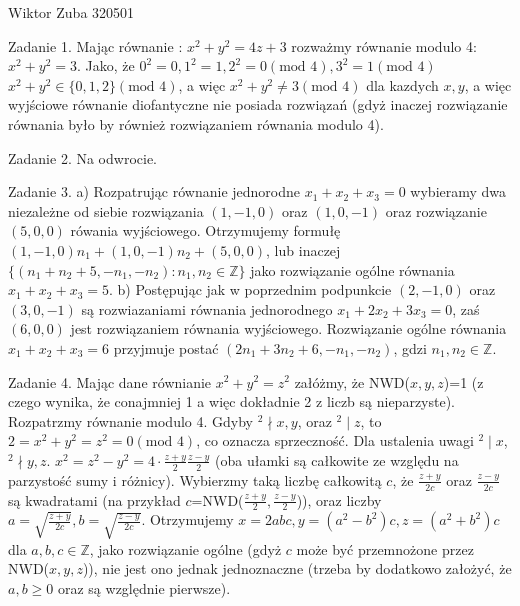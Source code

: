 \documentclass{article}
\begin{document}
Wiktor Zuba 320501
\newline

Zadanie 1.
\newline
\newline
Mając równanie : $x^2+y^2=4z+3$
rozważmy równanie modulo 4: $x^2+y^2=3$.\newline
Jako, że $0^2=0,1^2=1,2^2=0(\text{mod }4),3^2=1(\text{mod }4)$ $x^2+y^2\in\{0,1,2\}(\text{mod }4)$, a więc $x^2+y^2\neq3 (\text{mod }4)$ dla kazdych $x,y$,
a więc wyjściowe równanie diofantyczne nie posiada rozwiązań (gdyż inaczej rozwiązanie równania było by również rozwiązaniem równania modulo 4).
\newline

Zadanie 2. Na odwrocie.
\newline

Zadanie 3.
\newline
\newline
a) Rozpatrując równanie jednorodne $x_1+x_2+x_3=0$ wybieramy dwa niezależne od siebie rozwiązania $(1,-1,0)$ oraz $(1,0,-1)$ oraz rozwiązanie $(5,0,0)$ rówania wyjściowego.
Otrzymujemy formułę $(1,-1,0)n_1+(1,0,-1)n_2+(5,0,0)$, lub inaczej $\{(n_1+n_2+5,-n_1,-n_2):n_1,n_2\in\mathbb{Z}\}$ jako rozwiązanie ogólne równania $x_1+x_2+x_3=5$.\newline\newline
b) Postępując jak w poprzednim podpunkcie $(2,-1,0)$ oraz $(3,0,-1)$ są rozwiazaniami równania jednorodnego $x_1+2x_2+3x_3=0$, zaś $(6,0,0)$ jest rozwiązaniem równania wyjściowego.
Rozwiązanie ogólne równania $x_1+x_2+x_3=6$ przyjmuje postać $(2n_1+3n_2+6,-n_1,-n_2)$, gdzi $n_1,n_2\in\mathbb{Z}$.
\newline

Zadanie 4.
\newline
\newline
Mając dane równianie $x^2+y^2=z^2$ załóżmy, że NWD($x,y,z$)=1 (z czego wynika, że conajmniej 1 a więc dokładnie 2 z liczb są nieparzyste). Rozpatrzmy równanie modulo 4.
Gdyby $^2\nmid x,y$, oraz $^2\mid z$, to $2=x^2+y^2=z^2=0(\text{mod }4)$, co oznacza sprzeczność. Dla ustalenia uwagi $^2\mid x$, $^2\nmid y,z$.
$x^2=z^2-y^2=4\cdot\frac{z+y}{2}\frac{z-y}{2}$ (oba ułamki są całkowite ze względu na parzystość sumy i różnicy).
Wybierzmy taką liczbę całkowitą $c$, że $\frac{z+y}{2c}$ oraz $\frac{z-y}{2c}$ są kwadratami (na przykład $c$=NWD($\frac{z+y}{2},\frac{z-y}{2}$)),
oraz liczby $a=\sqrt{\frac{z+y}{2c}},b=\sqrt{\frac{z-y}{2c}}$. Otrzymujemy $x=2abc,y=(a^2-b^2)c,z=(a^2+b^2)c$ dla $a,b,c\in\mathbb{Z}$, jako rozwiązanie ogólne (gdyż $c$ może być przemnożone przez NWD($x,y,z$)),
nie jest ono jednak jednoznaczne (trzeba by dodatkowo założyć, że $a,b\ge0$ oraz są względnie pierwsze).
\newline
\end{document}
